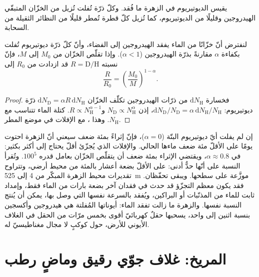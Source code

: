 يقيس الديوتيريوم في الزهرة ما فُقد. وكلّ ذرّة تُفلت
تُزيل من الخزّان المتبقّي الهيدروجين وقليلًا من الديوتيريوم، كما
تُزيل كلّ قطرة تُمطر قليلًا من النظائر الثقيلة من
السحابة.

\begin{proposition}\label{prop:b3:planetary-atmospheres:dh}
لنفترض أنّ خزّانًا من الماء يفقد الهيدروجين إلى الفضاء،
وأنّ كلّ ذرّة ديوتيريوم تُفلت بكفاءة $\alpha$ مقارنةً بذرّة الهيدروجين
($\alpha < 1$). وإذا تقلّص الخزّان من $M_0$ إلى $M$، فإنّ نسبته
$R = \mathrm{D}/\mathrm{H}$ قد ازدادت من $R_0$ إلى
\[
\frac R{R_0} = \left(\frac{M_0}M\right)^{1-\alpha}.
\]
\end{proposition}

\begin{proof}
فخسارة $\mathrm dN_\mathrm H$ من ذرّات الهيدروجين تكلّف الخزّان
$\mathrm dN_\mathrm D = \alpha R\,\mathrm dN_\mathrm H$ ذرّة ديوتيريوم:
$\mathrm dN_\mathrm D/N_\mathrm D = \alpha\,\mathrm dN_\mathrm H/
N_\mathrm H$، إذن $N_\mathrm D \propto N_\mathrm H^\alpha$ و$R \propto
N_\mathrm H^{\alpha - 1}$. كتلة الماء تتناسب مع
$N_\mathrm H$. وهذا ، مع الإفلات في موضع
المطر.
\end{proof}

إن لم يفلت أيّ ديوتيريوم البتّة ($\alpha = 0$)، فإنّ إثراءً بمئة ضعف
سيعني أنّ الزهرة احتوت يومًا على الأقلّ مئة ضعف
ماءها الحالي. والإفلات الذي يُجزّئ أقلّ يحتاج إلى أكثر بكثير: في 
$\alpha \approx 0.8$، ويقتضي الإثراء بمئة ضعف
أن يتقلّص الخزّان بعامل قدره $100^5$. وتُقرأ النسبة على أنّها حدٌّ
أدنى: على الأقلّ بضعة أعشار بالمئة من محيط أرضي،
وتتراوح تقديرات محيط الزهرة المبكّر من 4 إلى \qty{525}{m} موزَّعة
على سطحها. ويبقى تحفّظان. فقد يكون معظم التجزّؤ قد حدث
في فقدان آخر بضعة بارات من الماء فقط، وإمداد ثابت للماء
من المذنّبات أو البراكين، ويُفقد بالسرعة نفسها التي وصل بها، يمكن أن يُنتج النسبة نفسها.
والزهرة ما زالت تفقد الماء: أيوناتها المُفلتة هي
هيدروجين وأكسجين بنسبة اثنين إلى واحد، يسحبها حقلٌ كهربائيّ
أقوى بخمس مرّات من الحقل في الغلاف الأيوني للأرض، حول
كوكبٍ لا مجال مغناطيسيّ له.

\section{المريخ: غلاف جوّي رقيق وماضٍ رطب}\label{sec:b3:planetary-atmospheres:mars}

